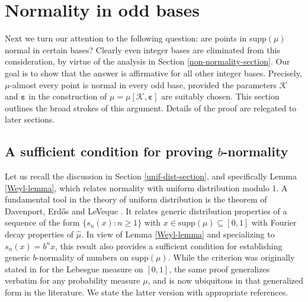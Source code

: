\documentclass[12pt, twoside]{article}
\theoremstyle{definition}
\numberwithin{equation}{section}
\begin{document}
\section{Normality in odd bases} \label{normality-section-1}
Next we turn our attention to the following question: are points in supp$(\mu)$ normal in certain bases? Clearly even integer bases are eliminated from this consideration, by virtue of the analysis in Section \ref{non-normality-section}. Our goal is to show that the answer is affirmative for all other integer bases. Precisely, $\mu$-almost every point is normal in every odd base, provided the parameters $\mathcal K$ and $\pmb{\varepsilon}$ in the construction of $\mu = \mu[\mathcal K, \pmb{\varepsilon}]$ are suitably chosen. This section outlines the broad strokes of this argument. Details of the proof are relegated to later sections. 
\subsection{A sufficient condition for proving $b$-normality}
Let us recall the discussion in Section \ref{unif-dist-section}, and specifically Lemma \ref{Weyl-lemma}, which relates normality with uniform distribution modulo 1.  A fundamental tool in the theory of uniform distribution is the theorem of Davenport, Erd\H{o}s and LeVeque \cite{del63}. It relates generic distribution properties of a sequence of the form $\{s_n(x) : n \geq 1\}$ with $x \in \text{supp}(\mu) \subseteq [0,1]$ with Fourier decay properties of $\widehat{\mu}$. In view of Lemma \ref{Weyl-lemma} and specializing to $s_n(x) = b^n x$, this result also provides a sufficient condition for establishing generic $b$-normality of numbers on supp$(\mu)$. While the criterion was originally stated in \cite{del63} for the Lebesgue measure on $[0,1]$, the same proof generalizes verbatim for any probability measure $\mu$, and is now ubiquitous in that generalized form in the literature. We state the latter version with appropriate references.       
\end{document}
